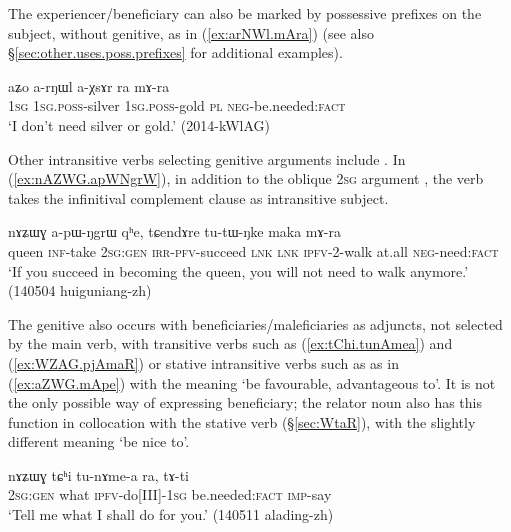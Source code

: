 The experiencer/beneficiary can also be marked by possessive prefixes on the subject, without genitive, as in (\ref{ex:arNWl.mAra}) (see also §\ref{sec:other.uses.poss.prefixes} for additional examples).

\begin{exe}
\ex \label{ex:arNWl.mAra}
 \gll aʑo a-rŋɯl a-χsɤr ra mɤ-ra \\
 \textsc{1sg} \textsc{1sg}.\textsc{poss}-silver \textsc{1sg}.\textsc{poss}-gold \textsc{pl} \textsc{neg}-be.needed:\textsc{fact} \\
 \glt `I don't  need silver or gold.' (2014-kWlAG)
\end{exe}

Other intransitive verbs selecting genitive arguments include . In (\ref{ex:nAZWG.apWNgrW}), in addition to the oblique \textsc{2sg} argument , the verb takes the infinitival complement clause  as intransitive subject.

\begin{exe}
\ex \label{ex:nAZWG.apWNgrW}
  nɤʑɯɣ a-pɯ-ŋgrɯ qʰe, tɕendɤre tu-tɯ-ŋke maka mɤ-ra \\
queen \textsc{inf}-take \textsc{2sg}:\textsc{gen} \textsc{irr}-\textsc{pfv}-succeed \textsc{lnk} \textsc{lnk} \textsc{ipfv}-2-walk at.all \textsc{neg}-need:\textsc{fact} \\
\glt `If you succeed in becoming the queen, you will not need to walk anymore.' (140504 huiguniang-zh) 
\end{exe}

The genitive also occurs with beneficiaries/maleficiaries as adjuncts, not selected by the main verb, with transitive verbs such as  (\ref{ex:tChi.tunAmea}) and  (\ref{ex:WZAG.pjAmaR}) or stative intransitive verbs such as  as in (\ref{ex:aZWG.mApe}) with the meaning `be favourable, advantageous to'.  It is not the only possible way of expressing beneficiary; the relator noun  also has this function in collocation with the stative verb  (§\ref{sec:WtaR}), with the slightly different meaning `be nice to'.

\begin{exe}
\ex \label{ex:tChi.tunAmea}
\gll nɤʑɯɣ tɕʰi tu-nɤme-a ra, tɤ-ti  \\
\textsc{2sg}:\textsc{gen} what \textsc{ipfv}-do[III]-\textsc{1sg} be.needed:\textsc{fact} \textsc{imp}-say \\
\glt `Tell me what I shall do for you.' (140511 alading-zh)
\end{exe}

